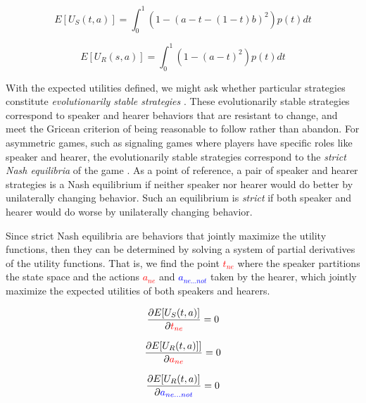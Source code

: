 \documentclass[linguex]{sp}
\theoremstyle{definition} \newtheorem{definition}{Definition}
\begin{document}
\begin{equation}
     E[U_S(t, a)] = \int_0^1 \left( 1 -(a - t - (1-t)b)^2 \right)p(t)dt
\end{equation}

\begin{equation}
      E[U_R(s, a)] = \int_0^1 \left( 1 -(a - t)^2 \right) p(t) dt
\end{equation}

With the expected utilities defined, we might ask whether particular strategies constitute \emph{evolutionarily stable strategies} \citep{maynard-smith1982}. These evolutionarily stable strategies correspond to speaker and hearer behaviors that are resistant to change, and meet the Gricean \citeyearpar[29]{grice1975} criterion of being reasonable to follow rather than abandon. For asymmetric games, such as signaling games where players have specific roles like speaker and hearer, the evolutionarily stable strategies correspond to the \emph{strict Nash equilibria} of the game \citep{selten:1980}.  As a point of reference, a pair of speaker and hearer strategies is a Nash equilibrium if neither speaker nor hearer would do better by unilaterally changing behavior. Such an equilibrium is \emph{strict} if both speaker and hearer would do worse by unilaterally changing behavior.  

Since strict Nash equilibria are behaviors that jointly maximize the utility functions, then they can be determined by solving a system of partial derivatives of the utility functions. That is, we find the point \emph{\textcolor{red}{$t_{ne}$}} where the speaker partitions the state space and the actions \emph{\textcolor{red}{$a_{ne}$}} and \emph{\textcolor{blue}{$a_{ne...not}$}} taken by the hearer, which jointly maximize the expected utilities of both speakers and hearers.

\begin{equation}
	\frac{\partial E[U_S(t, a)]}{\partial \emph{\textcolor{red}{$t_{ne}$}}} =  0 \\
\end{equation}

\begin{equation}
	\frac{\partial E[U_R(t, a)]]}{\partial \emph{\textcolor{red}{$a_{ne}$}}} = 0 \\
\end{equation}


\begin{equation}
	\frac{\partial E[U_R(t, a)]}{\partial \emph{\textcolor{blue}{$a_{ne...not}$}}} = 0
\end{equation}
\end{document}
